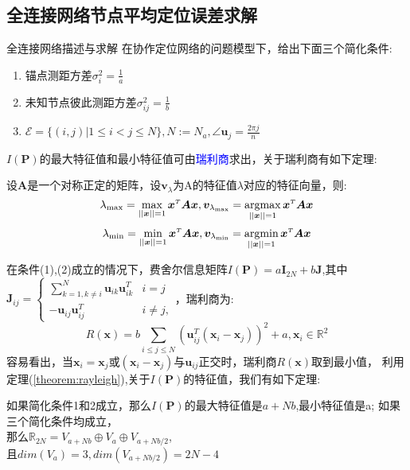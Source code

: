 \subsection{全连接网络节点平均定位误差求解}
{全连接网络描述与求解}
在协作定位网络的问题模型下，给出下面三个简化条件:
\begin{enumerate}
\item 锚点测距方差$\sigma_i^2=\frac{1}{a}$
\item 未知节点彼此测距方差$\sigma^2_{ij}=\frac{1}{b}$
\item $\mathcal{E}=\{(i,j)|1\leq i <j\leq N\},N:=N_a,\angle\bm{u}_j=\frac{2\pi j}{n}$
\end{enumerate}
$I(\bm{P})$的最大特征值和最小特征值可由\textcolor{blue}{瑞利商}求出，关于瑞利商有如下定理:
\begin{theorem}\label{theorem:rayleigh}
  设$\bm{A}$是一个对称正定的矩阵，设$\bm{v}_{\lambda}$为A的特征值$\lambda$对应的特征向量，则:
\[
\displaystyle\lambda_{\text{max}}=\max_{||\bm{x}||=1} \bm{x}^{\scriptscriptstyle T}\bm{A}\bm{x},\bm{v}_{\lambda_{\text{max}}}=\operatorname*{argmax}_{||\bm{x}||=1} \bm{x}^{\scriptscriptstyle T}\bm{A}\bm{x}
\]\[
\displaystyle\lambda_{\text{min}}=\min_{||\bm{x}||=1} \bm{x}^{\scriptscriptstyle T}\bm{A}\bm{x},\bm{v}_{\lambda_{\text{min}}}=\operatorname*{argmin}_{||\bm{x}||=1} \bm{x}^{\scriptscriptstyle T}\bm{A}\bm{x}
\]
\end{theorem}


在条件(1),(2)成立的情况下，费舍尔信息矩阵$I(\bm{P})=a\bm{I}_{2N}+b\bm{J}$,其中$\bm{J}_{ij}=\begin{cases}
\sum_{k=1,k\neq i}^N \bm{u}_{ik}\bm{u}_{ik}^T&i=j\\
-\bm{u}_{ij}\bm{u}_{ij}^T&i\neq j,
\end{cases}$，瑞利商为:
\begin{equation}
R(\bm{x})=b\sum_{i\leq j\leq N} (\bm{u}_{ij}^T(\bm{x}_i-\bm{x}_j))^2+a,\bm{x}_i\in \mathbb{R}^2
\end{equation}
容易看出，当$\bm{x}_i=\bm{x}_j$或$(\bm{x}_i-\bm{x}_j)$与$\bm{u}_{ij}$正交时，瑞利商$R(\bm{x})$取到最小值，
利用定理(\ref{theorem:rayleigh}),关于$I(\bm{P})$的特征值，我们有如下定理:
\begin{theorem}
如果简化条件1和2成立，那么$I(\bm{P})$的最大特征值是$a+Nb$,最小特征值是a;
如果三个简化条件均成立，\\
那么$\mathbb{R}_{2N}=V_{a+Nb}\oplus V_a\oplus V_{a+Nb/2}$,
\\且$dim(V_a)=3,dim(V_{a+Nb/2})=2N-4$
\end{theorem}


